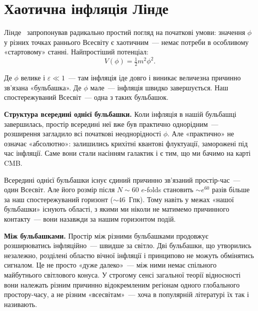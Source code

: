 
\chapter{Хаотична інфляція Лінде}
\label{sec:chaotic}

Лінде~\cite{linde_1983} запропонував радикально простий погляд
на початкові умови: значення $\phi$ у різних точках раннього
Всесвіту є хаотичним~--- немає потреби в особливому «стартовому»
станні. Найпростіший потенціал:
\begin{equation*}
  V(\phi) = \tfrac{1}{2}m^2\phi^2.
\end{equation*}

Де $\phi$ велике і $\varepsilon \ll 1$~--- там інфляція іде довго
і виникає величезна причинно зв'язана «бульбашка». Де $\phi$ мале~---
інфляція швидко завершується. Наш спостережуваний Всесвіт~---
одна з таких бульбашок.

\textbf{Структура всередині однієї бульбашки.} Коли інфляція
в нашій бульбашці завершилась, простір всередині неї вже був
практично однорідним~--- розширення загладило всі початкові
неоднорідності $\phi$. Але «практично» не означає «абсолютно»:
залишились крихітні квантові флуктуації, заморожені під час
інфляції. Саме вони стали насінням галактик і є тим, що ми
бачимо на карті CMB.

Всередині однієї бульбашки існує єдиний причинно зв'язаний
простір-час~--- один Всесвіт. Але його розмір після $N \sim 60$
$e$-folds становить $\sim e^{60}$ разів більше за наш
спостережуваний горизонт ($\sim 46$~Гпк). Тому навіть у
межах «нашої бульбашки» існують області, з якими ми ніколи
не матимемо причинного контакту~--- вони назавжди за
нашим горизонтом подій.

\textbf{Між бульбашками.} Простір між різними бульбашками
продовжує розширюватись інфляційно~--- швидше за світло.
Дві бульбашки, що утворились незалежно, розділені областю
вічної інфляції і принципово не можуть обмінятись сигналом.
Це не просто «дуже далеко»~--- між ними немає спільного
майбутнього світлового конуса. У строгому сенсі загальної теорії відносності вони
належать різним причинно відокремленим регіонам
одного глобального простору-часу, а не різним «всесвітам»~---
хоча в популярній літературі їх так і називають.

